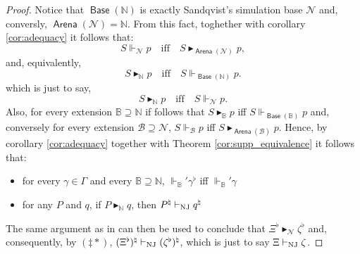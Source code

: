 \documentclass{lipics-v2021}
\newcommand{\supp}[1]{\Vdash_{#1}}
\newcommand{\wstrat}[1]{\blacktriangleright_{#1}}            %
\newcommand{\base}[1]{\mathcal{#1}}                    %
\newcommand{\arena}[1]{\mathbb{#1}}                     %
\newcommand{\sarena}{\mathbb{N}}                       %
\newcommand{\sbase}{\mathcal{N}}                       %
\newcommand{\tobase}[1]{\mathrel{\textsf{Base}}(#1)}            %
\newcommand{\toarena}[1]{\mathrel{\textsf{Arena}}(#1)}           %
\newcommand{\shrp}[1]{#1^{\natural}}                          %
\begin{document}
\begin{proof}
Notice that $\tobase{\sarena}$ is exactly Sandqvist's simulation base $\sbase$ and, conversly, $\toarena{\sbase} = \sarena$. From this fact, toghether with corollary \ref{cor:adequacy} it follows that:
\[
S \supp{\sbase} p \quad \text{iff} \quad S \wstrat{\toarena{\sbase}} p,
\]
and, equivalently,
\[
S \wstrat{\sarena} p \quad \text{iff} \quad S \supp{\tobase{\sarena}} p.
\]
which is just to say,
\[
S \wstrat{\sarena} p \quad \text{iff} \quad S \supp{\sbase} p.
\]
Also, for every extension $\arena{B \supseteq N}$ if follows that $S \wstrat{\arena{B}} p$ iff $S \supp{\tobase{\arena{B}}} p$ and, conversely for every extension $\base{B \supseteq \sbase}$, $S \supp{\base{B}} p$ iff $S \wstrat{\toarena{\base{B}}} p$. Hence, by corollary \ref{cor:adequacy} together with Theorem \ref{cor:supp_equivalence} it follows that:
\begin{itemize}
    \item[($\dagger*$)] for every $\gamma \in \Gamma$ and every $\arena{B} \supseteq \sarena$, $\supp{\arena{B}}'\gamma^\flat$ iff $\supp{\arena{B}}' \gamma$
    \item[($\ddagger*$)] for any $P$ and $q$, if $P \wstrat{\sarena} q$, then $\shrp{P} \vdash_{\rm NJ} \shrp{q}$ 
\end{itemize}
The same argument as in \cite{Sandqvist_Tor} can then be used to conclude that $\Xi^\flat \wstrat{\sbase} \zeta^\flat$ and, consequently, by $(\ddagger *)$, $\shrp{(\Xi^\flat)} \vdash_{\rm NJ} \shrp{(\zeta^\flat)}$, which is just to say $\Xi \vdash_{\rm NJ}  \zeta$.
\end{proof}
\end{document}
